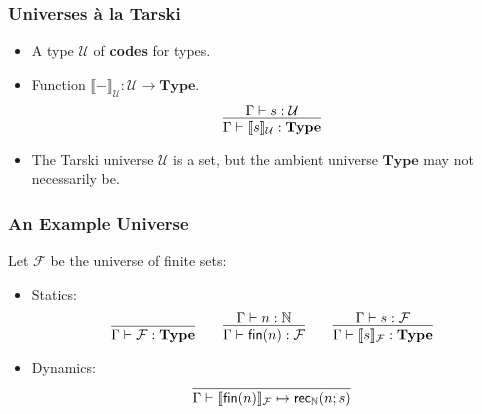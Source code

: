 \documentclass[12pt]{beamer}
\begin{document}
\begin{frame}
  \frametitle{Universes \`a la Tarski}\pause
  \begin{itemize}
    \item A type $\mathcal{U}$ of \textbf{codes} for types.
      \pause
    \item Function $\llbracket-\rrbracket_\mathcal{U} : \mathcal{U}\to\mathbf{Type}$.
      \pause
      \[
        \infer{
          \Gamma\vdash\llbracket s\rrbracket_\mathcal{U} : \mathbf{Type}
        }{
          \Gamma\vdash s : \mathcal{U}
        }
      \]
    \pause
    \item The Tarski universe $\mathcal{U}$ is a set, but the ambient universe $\mathbf{Type}$ may not necessarily be.
  \end{itemize}
\end{frame}

\begin{frame}
  \frametitle{An Example Universe}
  \pause
  Let $\mathcal{F}$ be the universe of finite sets:
  \pause
  \begin{itemize}
    \item Statics:
      \pause
      \[
        \infer{\Gamma\vdash\mathcal{F} : \mathbf{Type}}{}
        \qquad
        \infer{\Gamma\vdash\textsf{fin}(n) : \mathcal{F}}{\Gamma\vdash n : \mathbb{N}}
        \qquad
        \infer{\Gamma\vdash\llbracket s \rrbracket_\mathcal{F} : \mathbf{Type}}{\Gamma\vdash s : \mathcal{F}}
      \]
      \pause
    \item Dynamics:
      \[
        \infer{\Gamma\vdash\llbracket\textsf{fin}(n)\rrbracket_\mathcal{F} \mapsto \textsf{rec}_\mathbb{N}(n; s)}{}
      \]
  \end{itemize}
\end{frame}
\end{document}
